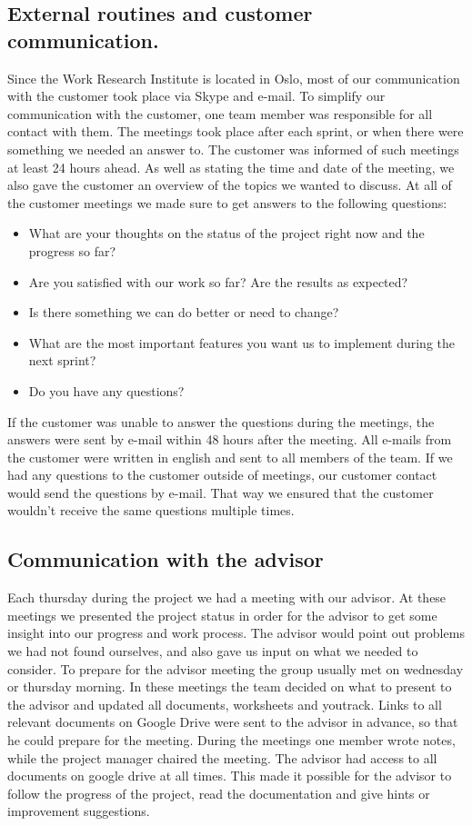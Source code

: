 \subsection{External routines and customer communication.}
\label{subsec:PlanningQualityExternal}
Since the Work Research Institute is located in Oslo, most of our communication with the customer took place via Skype and e-mail. To simplify our communication with the customer, one team member was responsible for all contact with them. The meetings took place after each sprint, or when there were something we needed an answer to. The customer was informed of such meetings at least 24 hours ahead. As well as stating the time and date of the meeting, we also gave the customer an overview of the topics we wanted to discuss. At all of the customer meetings we made sure to get answers to the following questions:
\begin{itemize}
\item What are your thoughts on the status of the project right now and the progress so far?
\item Are you satisfied with our work so far? Are the results as expected?
\item Is there something we can do better or need to change?
\item What are the most important features you want us to implement during the next sprint?
\item Do you have any questions?
\end{itemize}
If the customer was unable to answer the questions during the meetings, the answers were sent by e-mail within 48 hours after the meeting. All e-mails from the customer were written in english and sent to all members of the team. If we had any questions to the customer outside of meetings, our customer contact would send the questions by e-mail. That way we ensured that the customer wouldn’t receive the same questions multiple times.

\subsection{Communication with the advisor}
\label{subsec:PlanningQualityAdvisor}
Each thursday during the project we had a meeting with our advisor. At these meetings we presented the project status in order for the advisor to get some insight into our progress and work process. The advisor would point out problems we had not found ourselves, and also gave us input on what we needed to consider. To prepare for the advisor meeting the group usually met on wednesday or thursday morning. In these meetings the team decided on what to present to the advisor and updated all documents, worksheets and youtrack. Links to all relevant documents on Google Drive were sent to the advisor in advance, so that he could prepare for the meeting. During the meetings one member wrote notes, while the project manager chaired the meeting. The advisor had access to all documents on google drive at all times. This made it possible for the advisor to follow the progress of the project, read the documentation and give hints or improvement suggestions.